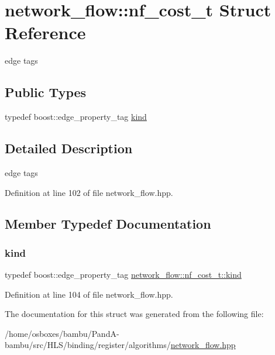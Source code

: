 \hypertarget{structnetwork__flow_1_1nf__cost__t}{}\section{network\+\_\+flow\+:\+:nf\+\_\+cost\+\_\+t Struct Reference}
\label{structnetwork__flow_1_1nf__cost__t}


edge tags  


\subsection*{Public Types}
\begin{DoxyCompactItemize}
\item 
typedef boost\+::edge\+\_\+property\+\_\+tag \hyperlink{structnetwork__flow_1_1nf__cost__t_ab3a373657c354f8197375af69d0a1b7b}{kind}
\end{DoxyCompactItemize}


\subsection{Detailed Description}
edge tags 

Definition at line 102 of file network\+\_\+flow.\+hpp.



\subsection{Member Typedef Documentation}
\mbox{\label{structnetwork__flow_1_1nf__cost__t_ab3a373657c354f8197375af69d0a1b7b}} 
\subsubsection{\texorpdfstring{kind}{kind}}
{\footnotesize\ttfamily typedef boost\+::edge\+\_\+property\+\_\+tag \hyperlink{structnetwork__flow_1_1nf__cost__t_ab3a373657c354f8197375af69d0a1b7b}{network\+\_\+flow\+::nf\+\_\+cost\+\_\+t\+::kind}}



Definition at line 104 of file network\+\_\+flow.\+hpp.



The documentation for this struct was generated from the following file\+:\begin{DoxyCompactItemize}
\item 
/home/osboxes/bambu/\+Pand\+A-\/bambu/src/\+H\+L\+S/binding/register/algorithms/\hyperlink{network__flow_8hpp}{network\+\_\+flow.\+hpp}\end{DoxyCompactItemize}
